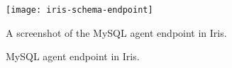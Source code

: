 \begin{figure}[H]
\begin{tcolorbox}
\begin{center}
\texttt{[image: iris-schema-endpoint]}
\end{center}
A screenshot of the MySQL agent endpoint in Iris.
\end{tcolorbox}
\caption{MySQL agent endpoint in Iris.}
\end{figure}